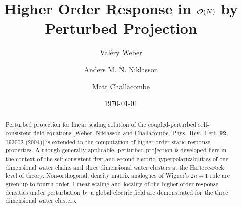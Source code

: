 \documentclass[prl,twocolumn,showpacs,twocolumngrid,superbib]{revtex4}
\begin{document}
\title{Higher Order Response in ${\cal O}(N)$ by Perturbed Projection} 

\author{Val\'ery Weber}
\author{Anders M. N. Niklasson}
\author{Matt Challacombe}

\date{\today}

\begin{abstract}
Perturbed projection  for linear scaling solution of the coupled-perturbed 
self-consistent-field equations 
[Weber, Niklasson and  Challacombe, Phys.\ Rev.\ Lett. {\bf 92}, 193002 (2004)] 
is extended to the computation of higher order static response properties.
Although generally applicable, perturbed projection is developed here 
in the context of the self-consistent first and second electric hyperpolarizabilities 
of one dimensional water chains and three dimensional water clusters at the 
Hartree-Fock level of theory. 
Non-orthogonal, density matrix analogues of Wigner's $2n+1$ rule are given up to fourth order.
Linear scaling and locality of the higher order response densities under perturbation 
by a global electric field are demonstrated for the three dimensional water clusters.  
\end{abstract}



\maketitle
\end{document}
